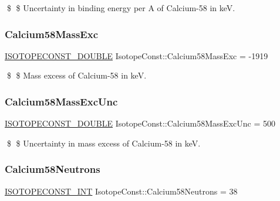 \$ \$ Uncertainty in binding energy per A of Calcium-\/58 in keV. \mbox{\label{group___isotope_const-_calcium-_ca58_ga9f503b718aa3dfb61af2b793e0760f2e}} 
\subsubsection{\texorpdfstring{Calcium58\+Mass\+Exc}{Calcium58MassExc}}
{\footnotesize\ttfamily \mbox{\hyperlink{group___isotope_const-_macros_ga8f45a7272ce02c0b4c65c44636ed719a}{I\+S\+O\+T\+O\+P\+E\+C\+O\+N\+S\+T\+\_\+\+D\+O\+U\+B\+LE}} Isotope\+Const\+::\+Calcium58\+Mass\+Exc = -\/1919}

\$ \$ Mass excess of Calcium-\/58 in keV. \mbox{\label{group___isotope_const-_calcium-_ca58_gad90bdb281f61b663f88e46ac4657094f}} 
\subsubsection{\texorpdfstring{Calcium58\+Mass\+Exc\+Unc}{Calcium58MassExcUnc}}
{\footnotesize\ttfamily \mbox{\hyperlink{group___isotope_const-_macros_ga8f45a7272ce02c0b4c65c44636ed719a}{I\+S\+O\+T\+O\+P\+E\+C\+O\+N\+S\+T\+\_\+\+D\+O\+U\+B\+LE}} Isotope\+Const\+::\+Calcium58\+Mass\+Exc\+Unc = 500}

\$ \$ Uncertainty in mass excess of Calcium-\/58 in keV. \mbox{\label{group___isotope_const-_calcium-_ca58_gaa0c449bdc622a41e8f9ed09bad7c979e}} 
\subsubsection{\texorpdfstring{Calcium58\+Neutrons}{Calcium58Neutrons}}
{\footnotesize\ttfamily \mbox{\hyperlink{group___isotope_const-_macros_ga5f18360b3e99483a35c32d789e62621c}{I\+S\+O\+T\+O\+P\+E\+C\+O\+N\+S\+T\+\_\+\+I\+NT}} Isotope\+Const\+::\+Calcium58\+Neutrons = 38}

